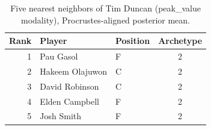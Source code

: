 \begin{table}[htbp]
  \centering\small
  \begin{tabular}{rllc}
    \toprule
    Rank & Player & Position & Archetype \\
    \midrule
    1 & Pau Gasol & F & 2 \\
    2 & Hakeem Olajuwon & C & 2 \\
    3 & David Robinson & C & 2 \\
    4 & Elden Campbell & F & 2 \\
    5 & Josh Smith & F & 2 \\
    \bottomrule
  \end{tabular}
  \caption{Five nearest neighbors of Tim Duncan (peak_value modality), Procrustes-aligned posterior mean.}
  \label{tab:Tim_Duncan_neighbors_peak_value}
\end{table}

